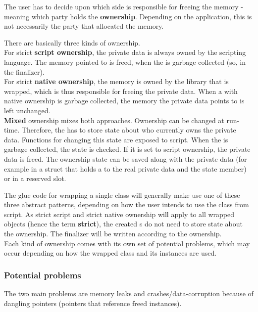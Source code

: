 The  user has to decide upon which side is responsible for freeing the memory - meaning which party holds the \textbf{ownership}. Depending on the application, this is not necessarily the party that allocated the memory.

There are basically three kinds of ownership.\\
For strict \textbf{script ownership}, the private data is always owned by the scripting language. The memory pointed to is freed, when the  is garbage collected (so, in the finalizer).\\
For strict \textbf{native ownership}, the memory is owned by the  library that is wrapped, which is thus responsible for freeing the private data. When a  with native ownership is garbage collected, the memory the private data points to is left unchanged.\\
\textbf{Mixed} ownership mixes both approaches. Ownership can be changed at run-time. Therefore, the  has to store state about who currently owns the private data. Functions for changing this state are exposed to script. When the  is garbage collected, the state is checked. If it is set to script ownership, the private data is freed. The ownership state can be saved along with the private data (for example in a struct that holds a  to the real private data and the state member) or in a reserved slot.

The glue code for wrapping a single class will generally make use one of these three abstract patterns, depending on how the user intends to use the class from script. As strict script and strict native ownership will apply to all wrapped objects (hence the term \textbf{strict}), the created s do not need to store state about the ownership. The finalizer will be written according to the ownership.\\
Each kind of ownership comes with its own set of potential problems, which may occur depending on how the wrapped class and its instances are used.

\subsubsection{Potential problems}

The two main problems are memory leaks and crashes/data-corruption because of dangling pointers (pointers that reference freed instances).

